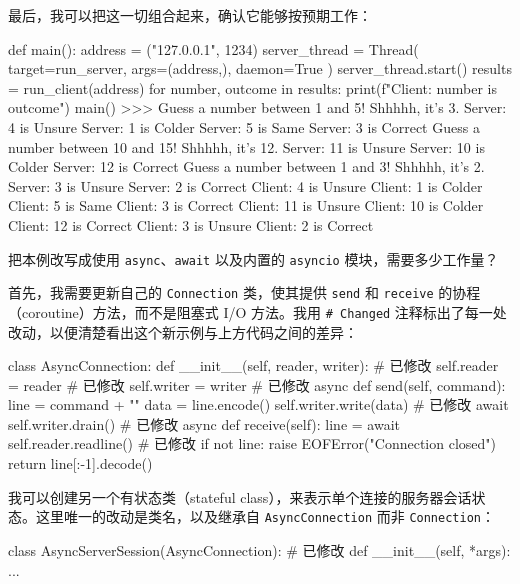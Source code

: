 最后，我可以把这一切组合起来，确认它能够按预期工作：

\begin{codebox}[python]
def main():
    address = ("127.0.0.1", 1234)
    server_thread = Thread(
        target=run_server, args=(address,), daemon=True
    )
    server_thread.start()
    results = run_client(address)
    for number, outcome in results:
        print(f"Client: {number} is {outcome}")
main()
>>>
Guess a number between 1 and 5! Shhhhh, it's 3.
Server: 4 is Unsure
Server: 1 is Colder
Server: 5 is Same
Server: 3 is Correct
Guess a number between 10 and 15! Shhhhh, it's 12.
Server: 11 is Unsure
Server: 10 is Colder
Server: 12 is Correct
Guess a number between 1 and 3! Shhhhh, it's 2.
Server: 3 is Unsure
Server: 2 is Correct
Client: 4 is Unsure
Client: 1 is Colder
Client: 5 is Same
Client: 3 is Correct
Client: 11 is Unsure
Client: 10 is Colder
Client: 12 is Correct
Client: 3 is Unsure
Client: 2 is Correct
\end{codebox}

把本例改写成使用 \texttt{async}、\texttt{await} 以及内置的 \texttt{asyncio} 模块，需要多少工作量？

首先，我需要更新自己的 \texttt{Connection} 类，使其提供 \texttt{send} 和 \texttt{receive} 的协程（coroutine）方法，而不是阻塞式 I/O 方法。我用 \texttt{\# Changed} 注释标出了每一处改动，以便清楚看出这个新示例与上方代码之间的差异：

\begin{codebox}[python]
class AsyncConnection:
    def __init__(self, reader, writer):      # 已修改
        self.reader = reader                 # 已修改
        self.writer = writer                 # 已修改
    async def send(self, command):
        line = command + "\n"
        data = line.encode()
        self.writer.write(data)              # 已修改
        await self.writer.drain()            # 已修改
    async def receive(self):
        line = await self.reader.readline()  # 已修改
        if not line:
            raise EOFError("Connection closed")
        return line[:-1].decode()
\end{codebox}

我可以创建另一个有状态类（stateful class），来表示单个连接的服务器会话状态。这里唯一的改动是类名，以及继承自 \texttt{AsyncConnection} 而非 \texttt{Connection}：

\begin{codebox}[python]
class AsyncServerSession(AsyncConnection):  # 已修改
    def __init__(self, *args):
        ...
\end{codebox}

